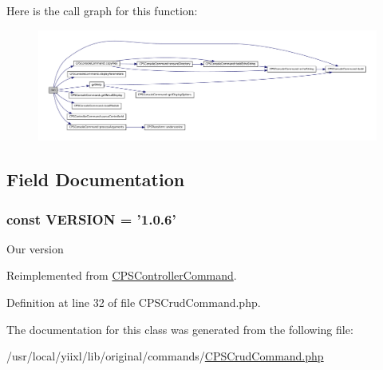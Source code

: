 Here is the call graph for this function:\nopagebreak
\begin{figure}[H]
\begin{center}
\leavevmode
\includegraphics[width=400pt]{classCPSCrudCommand_a330e31e8c3572ce01a4e1c8485c6aedd_cgraph}
\end{center}
\end{figure}




\subsection{Field Documentation}
\hypertarget{classCPSCrudCommand_af71005841ce53adac00581ab0ba24c1f}{
\subsubsection[{VERSION}]{\setlength{\rightskip}{0pt plus 5cm}const {\bf VERSION} = '1.0.6'}}
\label{classCPSCrudCommand_af71005841ce53adac00581ab0ba24c1f}
Our version 

Reimplemented from \hyperlink{classCPSControllerCommand_af71005841ce53adac00581ab0ba24c1f}{CPSControllerCommand}.



Definition at line 32 of file CPSCrudCommand.php.



The documentation for this class was generated from the following file:\begin{DoxyCompactItemize}
\item 
/usr/local/yiixl/lib/original/commands/\hyperlink{CPSCrudCommand_8php}{CPSCrudCommand.php}\end{DoxyCompactItemize}
